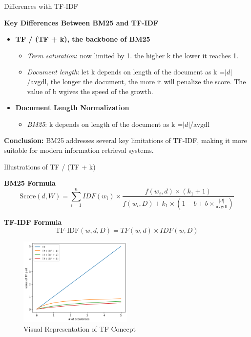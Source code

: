 \documentclass{beamer}
\begin{document}
\begin{frame}{Differences with TF-IDF}

\textbf{Key Differences Between BM25 and TF-IDF}

\begin{itemize}
  \item \textbf{TF / (TF + k), the backbone of BM25}
    \begin{itemize}
      \item \textit{Term saturation}: now limited by 1. the higher k the lower it reaches 1.
      \item \textit{Document length}: let k depends on length of the document as k =\( |d| \)/avgdl, the longer the document, the more it will penalize the score. The value of b wgives the speed of the growth.
    \end{itemize}

  \item \textbf{Document Length Normalization}
    \begin{itemize}
      \item \textit{BM25}: k depends on length of the document as k =\( |d| \)/avgdl
    \end{itemize}

\end{itemize}

\textbf{Conclusion:} BM25 addresses several key limitations of TF-IDF, making it more suitable for modern information retrieval systems.

\end{frame}

\begin{frame}{Illustrations of TF / (TF + k)}

\textbf{BM25 Formula}
\[ \text{Score}(d, W) = \sum_{i=1}^{n} IDF(w_i) \times \frac{f(w_i, d) \times (k_1 + 1)}{f(w_i, D) + k_1 \times (1 - b + b \times \frac{|d|}{\text{avgdl}})} \]

\textbf{TF-IDF Formula}
\[ \text{TF-IDF}(w, d, D) = TF(w, d) \times IDF(w, D) \]

\begin{figure}
  \centering
  \includegraphics[width=0.5\textwidth]{figures/tf.png}
  \caption{Visual Representation of TF Concept}
\end{figure}

\end{frame}
\end{document}
